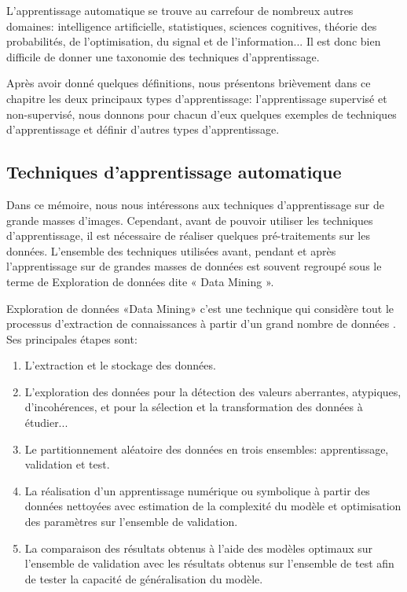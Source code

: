 \documentclass[12pt]{article}
\begin{document}
L'apprentissage automatique se trouve au carrefour de nombreux autres domaines: intelligence artificielle, statistiques, sciences cognitives, théorie des probabilités, de l'optimisation, du signal et de l'information... Il est donc bien difficile de donner une taxonomie des techniques d'apprentissage.

Après avoir donné quelques définitions, nous présentons brièvement dans ce chapitre les deux principaux types d'apprentissage: l'apprentissage supervisé et non-supervisé, nous donnons pour chacun d'eux quelques exemples de techniques d'apprentissage et définir d'autres types d'apprentissage.
\subsection{Techniques d'apprentissage automatique}
Dans ce mémoire, nous nous intéressons aux techniques d'apprentissage sur de grande masses d'images. Cependant, avant de pouvoir utiliser les techniques d'apprentissage, il est nécessaire de réaliser quelques pré-traitements sur les données. L'ensemble des techniques utilisées avant, pendant et après l'apprentissage sur de grandes masses de données est souvent regroupé sous le terme de Exploration de données dite « Data Mining ».

Exploration de données «Data Mining» c’est une technique qui considère tout le processus d'extraction de connaissances à partir d'un grand nombre de données \cite{1}.\\
Ses principales étapes sont:
\begin{enumerate}
  	  \item L'extraction et le stockage des données.
  	  \item L'exploration des données pour la détection des valeurs aberrantes, atypiques, d'incohérences, et pour la sélection et la transformation des données à étudier...
  	\item Le partitionnement aléatoire des données en trois ensembles: apprentissage, validation et test.
  	\item La réalisation d'un apprentissage numérique ou symbolique à partir des données nettoyées avec estimation de la complexité du modèle et optimisation des paramètres sur l'ensemble de validation.
  	\item La comparaison des résultats obtenus à l'aide des modèles optimaux sur l'ensemble de validation avec les résultats obtenus sur l'ensemble de test afin de tester la capacité de généralisation du modèle.\\
\end{enumerate}
\end{document}
